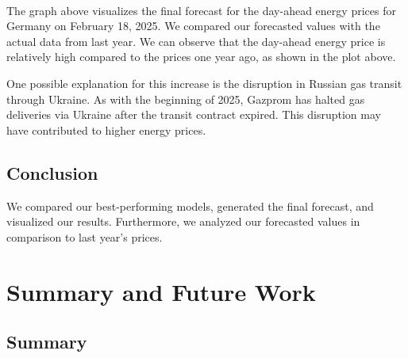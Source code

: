 \documentclass[a4paper]{article}
\begin{document}
    \begin{center}
    \end{center}
    { \hspace*{\fill} \\}
    
    The graph above visualizes the final forecast for the day-ahead energy
prices for Germany on February 18, 2025. We compared our forecasted
values with the actual data from last year. We can observe that the
day-ahead energy price is relatively high compared to the prices one
year ago, as shown in the plot above.

One possible explanation for this increase is the disruption in Russian
gas transit through Ukraine. As with the beginning of 2025, Gazprom has
halted gas deliveries via Ukraine after the transit contract expired.
This disruption may have contributed to higher energy prices.

    \subsection{Conclusion}\label{conclusion}

We compared our best-performing models, generated the final forecast,
and visualized our results. Furthermore, we analyzed our forecasted
values in comparison to last year's prices.

    \section{Summary and Future Work}\label{summary-and-future-work}

    \subsection{Summary}\label{summary}
\end{document}
